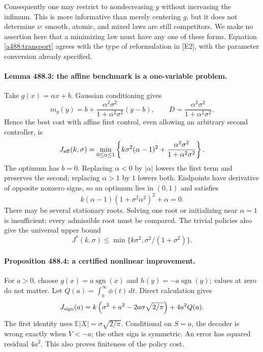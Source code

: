\documentclass[11pt]{article}
\begin{document}
Consequently one may restrict to nondecreasing $g$ without increasing the
infimum. This is more informative than merely centering $g$, but it does
not determine $\nu$: smooth, atomic, and mixed laws are still competitors.
We make no assertion here that a minimizing law must have any one of
these forms. Equation \eqref{a488:transport} agrees with the type of
reformulation in [E2], with the parameter conversion already specified.

\paragraph{Lemma 488.3: the affine benchmark is a one-variable problem.}
Take $g(x)=\alpha x+b$. Gaussian conditioning gives
\[
 m_g(y)=b+\frac{\alpha^2\sigma^2}{1+\alpha^2\sigma^2}(y-b),
 \qquad
 D=\frac{\alpha^2\sigma^2}{1+\alpha^2\sigma^2}.
\]
Hence the best cost with affine first control, even allowing an arbitrary
second controller, is
\begin{equation}\label{a488:affine}
 J_{\rm aff}(k,\sigma)
 =\min_{0\le\alpha\le1}
 \left\{k\sigma^2(\alpha-1)^2+
                \frac{\alpha^2\sigma^2}{1+\alpha^2\sigma^2}\right\}.
\end{equation}
The optimum has $b=0$. Replacing $\alpha<0$ by $|\alpha|$ lowers the
first term and preserves the second; replacing $\alpha>1$ by $1$ lowers
both. Endpoints have derivative of opposite nonzero signs, so an optimum
lies in $(0,1)$ and satisfies
\begin{equation}\label{a488:quintic}
       k(\alpha-1)(1+\sigma^2\alpha^2)^2+\alpha=0.
\end{equation}
There may be several stationary roots. Solving one root or initializing
near $\alpha=1$ is insufficient; every admissible root must be compared.
The trivial policies also give the universal upper bound
\[
      J^*(k,\sigma)\le\min\{k\sigma^2,\sigma^2/(1+\sigma^2)\}.
\]

\paragraph{Proposition 488.4: a certified nonlinear improvement.}
For $a>0$, choose $g(x)=a\operatorname{sgn}(x)$ and
$h(y)=-a\operatorname{sgn}(y)$; values at zero do not matter.
Let $Q(a)=\int_a^\infty\phi(t)\,dt$. Direct calculation gives
\begin{equation}\label{a488:signcost}
 J_{\rm sign}(a)=k\left(\sigma^2+a^2-2a\sigma\sqrt{2/\pi}\right)
                        +4a^2Q(a).
\end{equation}
The first identity uses $\mathbb E|X|=\sigma\sqrt{2/\pi}$.
Conditional on $S=a$, the decoder is wrong exactly when $V<-a$;
the other sign is symmetric. An error has squared residual $4a^2$.
This also proves finiteness of the policy cost.
\end{document}
